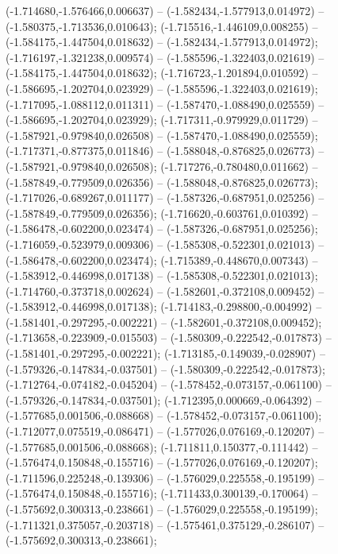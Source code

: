  (-1.714680,-1.576466,0.006637) -- (-1.582434,-1.577913,0.014972) -- (-1.580375,-1.713536,0.010643);
 (-1.715516,-1.446109,0.008255) -- (-1.584175,-1.447504,0.018632) -- (-1.582434,-1.577913,0.014972);
 (-1.716197,-1.321238,0.009574) -- (-1.585596,-1.322403,0.021619) -- (-1.584175,-1.447504,0.018632);
 (-1.716723,-1.201894,0.010592) -- (-1.586695,-1.202704,0.023929) -- (-1.585596,-1.322403,0.021619);
 (-1.717095,-1.088112,0.011311) -- (-1.587470,-1.088490,0.025559) -- (-1.586695,-1.202704,0.023929);
 (-1.717311,-0.979929,0.011729) -- (-1.587921,-0.979840,0.026508) -- (-1.587470,-1.088490,0.025559);
 (-1.717371,-0.877375,0.011846) -- (-1.588048,-0.876825,0.026773) -- (-1.587921,-0.979840,0.026508);
 (-1.717276,-0.780480,0.011662) -- (-1.587849,-0.779509,0.026356) -- (-1.588048,-0.876825,0.026773);
 (-1.717026,-0.689267,0.011177) -- (-1.587326,-0.687951,0.025256) -- (-1.587849,-0.779509,0.026356);
 (-1.716620,-0.603761,0.010392) -- (-1.586478,-0.602200,0.023474) -- (-1.587326,-0.687951,0.025256);
 (-1.716059,-0.523979,0.009306) -- (-1.585308,-0.522301,0.021013) -- (-1.586478,-0.602200,0.023474);
 (-1.715389,-0.448670,0.007343) -- (-1.583912,-0.446998,0.017138) -- (-1.585308,-0.522301,0.021013);
 (-1.714760,-0.373718,0.002624) -- (-1.582601,-0.372108,0.009452) -- (-1.583912,-0.446998,0.017138);
 (-1.714183,-0.298800,-0.004992) -- (-1.581401,-0.297295,-0.002221) -- (-1.582601,-0.372108,0.009452);
 (-1.713658,-0.223909,-0.015503) -- (-1.580309,-0.222542,-0.017873) -- (-1.581401,-0.297295,-0.002221);
 (-1.713185,-0.149039,-0.028907) -- (-1.579326,-0.147834,-0.037501) -- (-1.580309,-0.222542,-0.017873);
 (-1.712764,-0.074182,-0.045204) -- (-1.578452,-0.073157,-0.061100) -- (-1.579326,-0.147834,-0.037501);
 (-1.712395,0.000669,-0.064392) -- (-1.577685,0.001506,-0.088668) -- (-1.578452,-0.073157,-0.061100);
 (-1.712077,0.075519,-0.086471) -- (-1.577026,0.076169,-0.120207) -- (-1.577685,0.001506,-0.088668);
 (-1.711811,0.150377,-0.111442) -- (-1.576474,0.150848,-0.155716) -- (-1.577026,0.076169,-0.120207);
 (-1.711596,0.225248,-0.139306) -- (-1.576029,0.225558,-0.195199) -- (-1.576474,0.150848,-0.155716);
 (-1.711433,0.300139,-0.170064) -- (-1.575692,0.300313,-0.238661) -- (-1.576029,0.225558,-0.195199);
 (-1.711321,0.375057,-0.203718) -- (-1.575461,0.375129,-0.286107) -- (-1.575692,0.300313,-0.238661);
